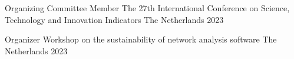 

\begin{cvhonors}

  \cvhonor
    {Organizing Committee Member} %
    {The 27th International Conference on Science, Technology and Innovation Indicators} %
    {The Netherlands} %
    {2023} %

  \cvhonor
    {Organizer} %
    {Workshop on the sustainability of network analysis software} %
    {The Netherlands} %
    {2023} %

\end{cvhonors}
